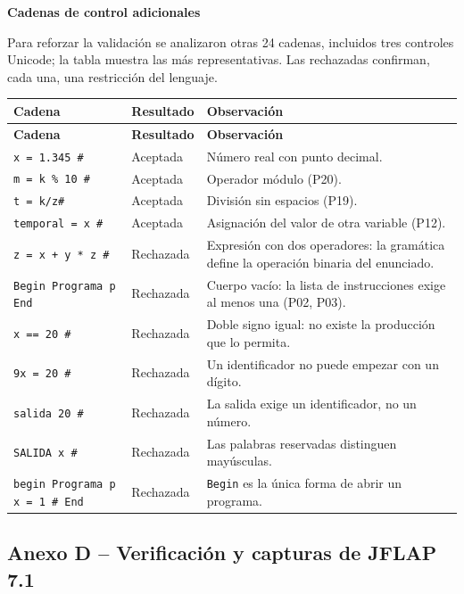 \documentclass[11pt,letterpaper]{article}
\newcommand{\apartado}[1]{\par\Needspace{4\baselineskip}\medskip\noindent\textbf{#1}\par\nobreak\smallskip}
\begin{document}
\apartado{Cadenas de control adicionales}

Para reforzar la validación se analizaron otras 24 cadenas, incluidos tres controles
Unicode; la tabla muestra las más representativas. Las rechazadas confirman, cada una, una
restricción del lenguaje.

\begin{longtable}{|L{6.6cm}|L{2.6cm}|L{\dimexpr\textwidth-6.6cm-2.6cm-6\arrayrulewidth\relax}|}
\hline
{}\textbf{Cadena} & \textbf{Resultado} & \textbf{Observación}\\\hline
\endfirsthead
\hline
{}\textbf{Cadena} & \textbf{Resultado} & \textbf{Observación}\\\hline
\endhead

\texttt{x = 1.345 \#} & Aceptada & Número real con punto decimal.\\\hline
\texttt{m = k \% 10 \#} & Aceptada & Operador módulo (P20).\\\hline
\texttt{t = k/z\#} & Aceptada & División sin espacios (P19).\\\hline
\texttt{temporal = x \#} & Aceptada & Asignación del valor de otra variable (P12).\\\hline
\texttt{z = x + y * z \#} & Rechazada & Expresión con dos operadores: la gramática define la operación binaria del enunciado.\\\hline
\texttt{Begin Programa p End} & Rechazada & Cuerpo vacío: la lista de instrucciones exige al menos una (P02, P03).\\\hline
\texttt{x == 20 \#} & Rechazada & Doble signo igual: no existe la producción que lo permita.\\\hline
\texttt{9x = 20 \#} & Rechazada & Un identificador no puede empezar con un dígito.\\\hline
\texttt{salida 20 \#} & Rechazada & La salida exige un identificador, no un número.\\\hline
\texttt{SALIDA x \#} & Rechazada & Las palabras reservadas distinguen mayúsculas.\\\hline
\texttt{begin Programa p x = 1 \# End} & Rechazada & \texttt{Begin} es la única forma de abrir un programa.\\\hline
\end{longtable}

\subsection*{Anexo D -- Verificación y capturas de JFLAP 7.1}
\end{document}
